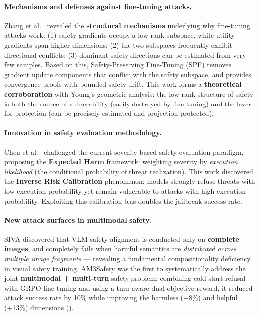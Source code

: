 \paragraph{Mechanisms and defenses against fine-tuning attacks.}
Zhang et al.\ \cite{zhang2026spf} revealed the \textbf{structural mechanisms}
underlying why fine-tuning attacks \cite{qi2023finetuning} work:
(1) safety gradients occupy a low-rank subspace, while utility gradients span higher dimensions;
(2) the two subspaces frequently exhibit directional conflicts;
(3) dominant safety directions can be estimated from very few samples.
Based on this, Safety-Preserving Fine-Tuning (SPF)
removes gradient update components that conflict with the safety subspace,
and provides convergence proofs with bounded safety drift.
This work forms a \textbf{theoretical corroboration} with Young's \cite{young2026alignmenttax} geometric analysis:
the low-rank structure of safety is both the source of vulnerability (easily destroyed by fine-tuning)
and the lever for protection (can be precisely estimated and projection-protected).

\paragraph{Innovation in safety evaluation methodology.}
Chen et al.\ \cite{chen2026expectedharm} challenged the current severity-based safety evaluation paradigm,
proposing the \textbf{Expected Harm} framework:
weighting severity by \emph{execution likelihood} (the conditional probability of threat realization).
This work discovered the \textbf{Inverse Risk Calibration} phenomenon:
models strongly refuse threats with low execution probability
yet remain vulnerable to attacks with high execution probability.
Exploiting this calibration bias doubles the jailbreak success rate.

\paragraph{New attack surfaces in multimodal safety.}
SIVA \cite{rashid2026siva} discovered that VLM safety alignment is conducted only on \textbf{complete images},
and completely fails when harmful semantics are \emph{distributed across multiple image fragments} ---
revealing a fundamental compositionality deficiency in visual safety training.
AM3Safety \cite{zhu2026am3safety} was the first to systematically address
the joint \textbf{multimodal + multi-turn} safety problem:
combining cold-start refusal with GRPO fine-tuning
and using a turn-aware dual-objective reward,
it reduced attack success rate by 10\% while improving the harmless (+8\%) and helpful (+13\%) dimensions
().

